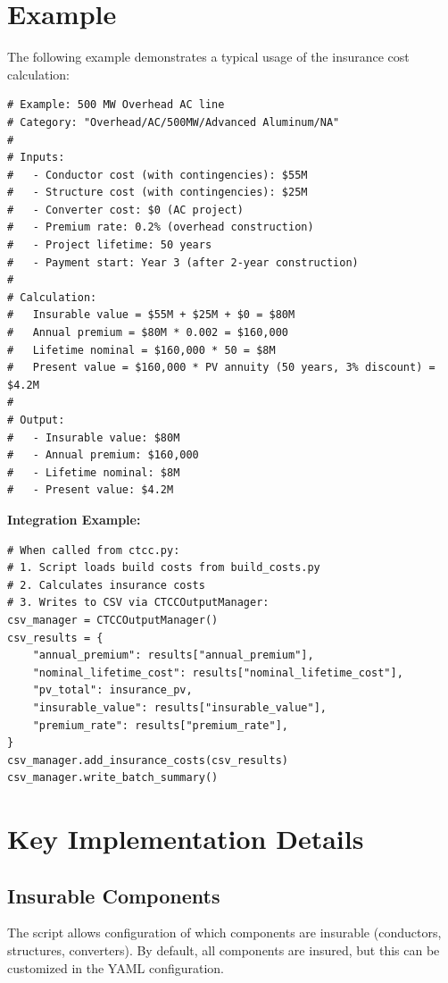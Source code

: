 \documentclass[ctcc_full_documentation.tex]{subfiles}
\begin{document}
\section{Example}

The following example demonstrates a typical usage of the insurance cost calculation:

\begin{lstlisting}
# Example: 500 MW Overhead AC line
# Category: "Overhead/AC/500MW/Advanced Aluminum/NA"
# 
# Inputs:
#   - Conductor cost (with contingencies): $55M
#   - Structure cost (with contingencies): $25M
#   - Converter cost: $0 (AC project)
#   - Premium rate: 0.2% (overhead construction)
#   - Project lifetime: 50 years
#   - Payment start: Year 3 (after 2-year construction)
#
# Calculation:
#   Insurable value = $55M + $25M + $0 = $80M
#   Annual premium = $80M * 0.002 = $160,000
#   Lifetime nominal = $160,000 * 50 = $8M
#   Present value = $160,000 * PV annuity (50 years, 3% discount) = $4.2M
#
# Output:
#   - Insurable value: $80M
#   - Annual premium: $160,000
#   - Lifetime nominal: $8M
#   - Present value: $4.2M
\end{lstlisting}

\textbf{Integration Example:}

\begin{lstlisting}
# When called from ctcc.py:
# 1. Script loads build costs from build_costs.py
# 2. Calculates insurance costs
# 3. Writes to CSV via CTCCOutputManager:
csv_manager = CTCCOutputManager()
csv_results = {
    "annual_premium": results["annual_premium"],
    "nominal_lifetime_cost": results["nominal_lifetime_cost"],
    "pv_total": insurance_pv,
    "insurable_value": results["insurable_value"],
    "premium_rate": results["premium_rate"],
}
csv_manager.add_insurance_costs(csv_results)
csv_manager.write_batch_summary()
\end{lstlisting}

\section{Key Implementation Details}

\subsection{Insurable Components}

The script allows configuration of which components are insurable (conductors, structures, converters). By default, all components are insured, but this can be customized in the YAML configuration.
\end{document}
